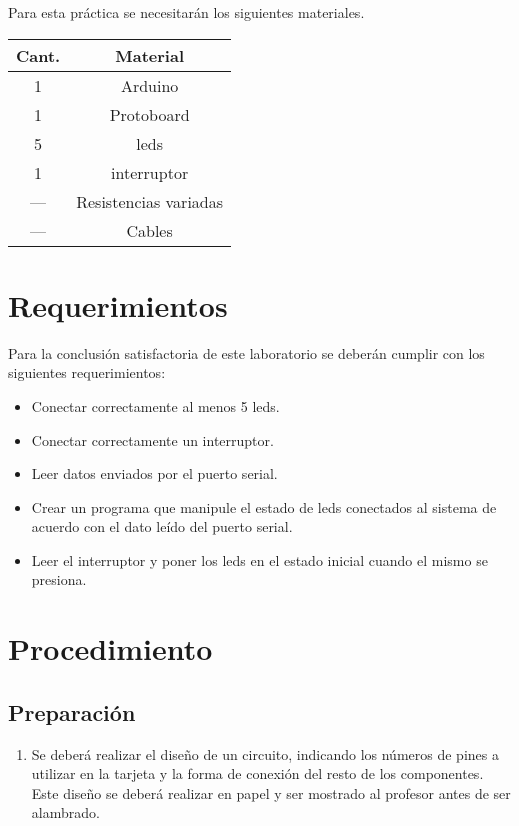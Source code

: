 \documentclass[12pt,letterpaper]{IEEEtran}
\begin{document}
Para esta práctica se necesitarán los siguientes materiales.

\begin{center}
\begin{tabular}{c|c}\hline
	Cant. & \hspace{2cm}Material\hspace{2cm} \\\hline\hline
	1 	& Arduino 		\\\hline
	1	& Protoboard 	\\\hline	
	5	& leds			\\\hline
	1   & interruptor		\\\hline
	---	& Resistencias variadas \\\hline
	--- & Cables		\\\hline
\end{tabular}
\end{center}

\section{Requerimientos}

Para la conclusión satisfactoria de este laboratorio se deberán cumplir con los siguientes requerimientos:

\begin{itemize}
	\item Conectar correctamente al menos 5 leds.
	\item Conectar correctamente un interruptor.
	\item Leer datos enviados por el puerto serial.
    \item Crear un programa que manipule el estado de leds conectados al sistema de acuerdo con el dato leído del puerto serial.
    \item Leer el interruptor y poner los leds en el estado inicial cuando el mismo se presiona.
\end{itemize}

\section{Procedimiento}


\subsection{Preparación}

\begin{enumerate}
	\item Se deberá realizar el diseño de un circuito, indicando los números de pines a utilizar en la tarjeta y la forma de conexión del resto de los componentes. Este diseño se deberá realizar en papel y ser mostrado al profesor antes de ser alambrado.

\end{enumerate}
\end{document}
